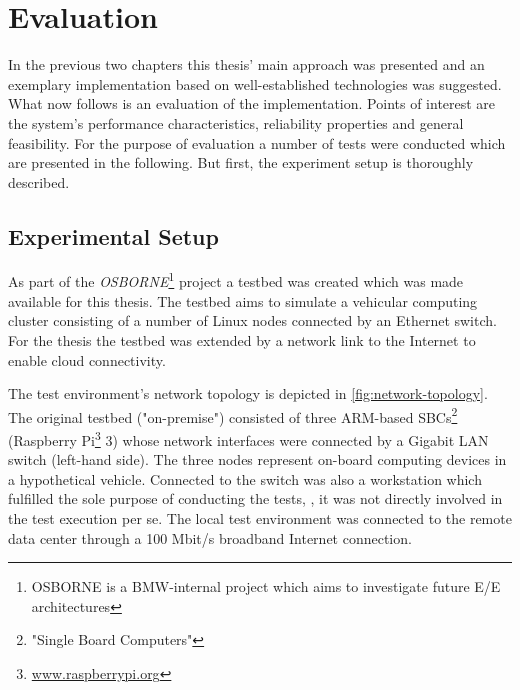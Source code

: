 \chapter{Evaluation}\label{chapter:evaluation}
In the previous two chapters this thesis' main approach was presented and an exemplary implementation based on well-established technologies was suggested. What now follows is an evaluation of the implementation. Points of interest are the system's performance characteristics, reliability properties and general feasibility. For the purpose of evaluation a number of tests were conducted which are presented in the following. But first, the experiment setup is thoroughly described.


\section{Experimental Setup}\label{sec:testsetup}

As part of the \emph{OSBORNE}\footnote{OSBORNE is a BMW-internal project which aims to investigate future E/E architectures} project a testbed was created which was made available for this thesis. The testbed aims to simulate a vehicular computing cluster consisting of a number of Linux nodes connected by an Ethernet switch. For the thesis the testbed was extended by a network link to the Internet to enable cloud connectivity. 

The test environment's network topology is depicted in \autoref{fig:network-topology}. The original testbed ("on-premise") consisted of three ARM-based SBCs\footnote{"Single Board Computers"} (Raspberry Pi\footnote{\url{www.raspberrypi.org}} 3) whose network interfaces were connected by a Gigabit LAN switch (left-hand side). The three nodes represent on-board computing devices in a hypothetical vehicle. Connected to the switch was also a workstation which fulfilled the sole purpose of conducting the tests, \ie , it was not directly involved in the test execution per se. The local test environment was connected to the remote data center through a 100 Mbit/s broadband Internet connection.

